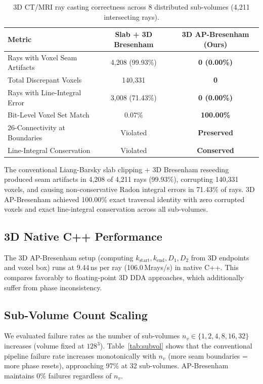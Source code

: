 \documentclass[12pt,a4paper]{article}
\theoremstyle{definition}
\newcommand{\kst}{k_{\mathrm{start}}}
\newcommand{\ken}{k_{\mathrm{end}}}
\begin{document}
\begin{table}[tb]
\centering
\caption{3D CT/MRI ray casting correctness across 8
distributed sub-volumes (4,211 intersecting rays).}
\label{tab:3d_correctness}
\begin{tabular}{lcc}
\toprule
\textbf{Metric} &
  \textbf{Slab + 3D Bresenham} &
  \textbf{3D AP-Bresenham (Ours)} \\
\midrule
Rays with Voxel Seam Artifacts  & 4,208 (99.93\%)   & \textbf{0 (0.00\%)} \\
Total Discrepant Voxels         & 140,331           & \textbf{0} \\
Rays with Line-Integral Error   & 3,008 (71.43\%)   & \textbf{0 (0.00\%)} \\
Bit-Level Voxel Set Match       & 0.07\%            & \textbf{100.00\%} \\
26-Connectivity at Boundaries   & Violated          & \textbf{Preserved} \\
Line-Integral Conservation      & Violated          & \textbf{Conserved} \\
\bottomrule
\end{tabular}
\end{table}

The conventional Liang-Barsky slab clipping + 3D Bresenham
reseeding produced seam artifacts in 4,208 of 4,211 rays
(99.93\%), corrupting 140,331 voxels, and causing
non-conservative Radon integral errors in 71.43\% of rays.
3D AP-Bresenham achieved 100.00\% exact traversal identity
with zero corrupted voxels and exact line-integral
conservation across all sub-volumes.

\subsection{3D Native C++ Performance}

The 3D AP-Bresenham setup (computing $\kst, \ken, D_1,
D_2$ from 3D endpoints and voxel box) runs at 9.44\,ns
per ray (106.0\,Mrays/s) in native C++. This compares
favorably to floating-point 3D DDA approaches, which
additionally suffer from phase inconsistency.

\subsection{Sub-Volume Count Scaling}

We evaluated failure rates as the number of sub-volumes
$n_v \in \{1, 2, 4, 8, 16, 32\}$ increases (volume
fixed at $128^3$). Table~\ref{tab:subvol} shows that the
conventional pipeline failure rate increases monotonically
with $n_v$ (more seam boundaries = more phase resets),
approaching 97\% at 32 sub-volumes. AP-Bresenham maintains
0\% failures regardless of $n_v$.
\end{document}
